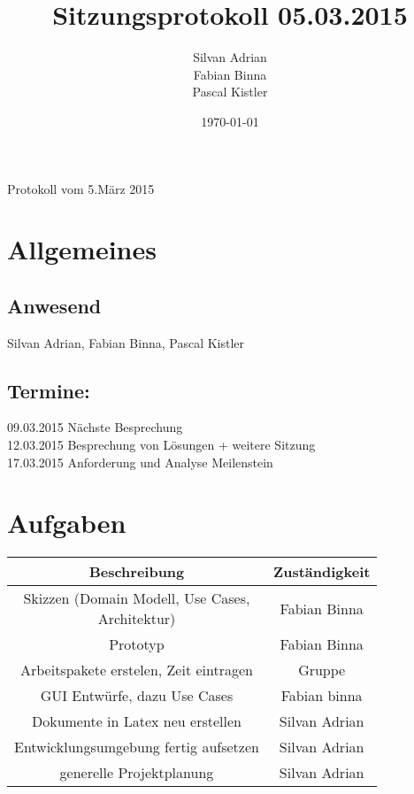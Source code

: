 \documentclass[11pt]{scrartcl}
\title{Sitzungsprotokoll 05.03.2015}
\author{Silvan Adrian \\ Fabian Binna \\ Pascal Kistler}
\date{\today{}}
\begin{document}
\large{Protokoll vom 5.März 2015}

\section{Allgemeines}
\label{sec:Allgemein}

\subsection{Anwesend}
\label{sec:Anwesend}
Silvan Adrian, Fabian Binna, Pascal Kistler

\subsection{Termine:}
\label{sec:Termine}
09.03.2015 Nächste Besprechung \\
12.03.2015 Besprechung von Lösungen + weitere Sitzung \\
17.03.2015 Anforderung und Analyse Meilenstein
\section{Aufgaben}
\label{sec:Aufgaben}
\begin{tabularx}{\textwidth}{c c }
\textbf{Beschreibung}  & \textbf{Zuständigkeit} \\
\hline
\shortstack{Skizzen (Domain Modell, Use Cases, \\ Architektur)} & Fabian Binna\\
\hline
Prototyp & Fabian Binna \\
\hline
Arbeitspakete erstelen, Zeit eintragen & Gruppe \\
\hline
GUI Entwürfe, dazu Use Cases & Fabian binna \\
\hline
Dokumente in Latex neu erstellen & Silvan Adrian \\
\hline
Entwicklungsumgebung fertig aufsetzen & Silvan Adrian \\
\hline
generelle Projektplanung & Silvan Adrian \\
\end{tabularx}
\end{document}
